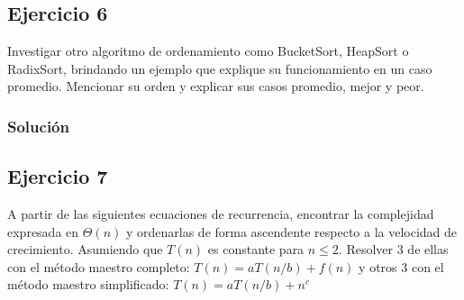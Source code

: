 \documentclass{article}
\begin{document}


\subsection*{Ejercicio 6}
Investigar otro algoritmo de ordenamiento como BucketSort, HeapSort o RadixSort, brindando un ejemplo que explique su funcionamiento en un caso promedio. Mencionar su orden y explicar sus casos promedio, mejor y peor.

\subsubsection*{Solución}


\subsection*{Ejercicio 7}
A partir de las siguientes ecuaciones de recurrencia, encontrar la complejidad expresada en $\Theta (n)$ y ordenarlas de forma ascendente respecto a la velocidad de crecimiento. Asumiendo que $T(n)$ es constante para $n \leq 2$. Resolver 3 de ellas con el método maestro completo: $T(n) = a T(n/b) + f(n)$ y otros 3 con el método maestro simplificado: $T(n) = a T(n/b) + n^c$
\end{document}

